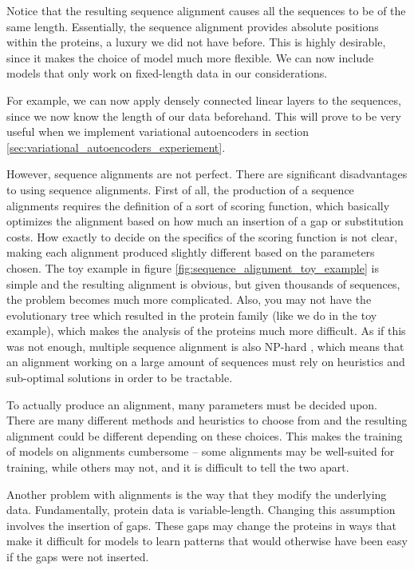 Notice that the resulting sequence alignment causes all the sequences to be of the same length. Essentially, the sequence alignment provides absolute positions within the proteins, a luxury we did not have before. This is highly desirable, since it makes the choice of model much more flexible. We can now include models that only work on fixed-length data in our considerations.

For example, we can now apply densely connected linear layers to the sequences, since we now know the length of our data beforehand. This will prove to be very useful when we implement variational autoencoders in section \ref{sec:variational_autoencoders_experiement}.

However, sequence alignments are not perfect. There are significant disadvantages to using sequence alignments. First of all, the production of a sequence alignments requires the definition of a sort of scoring function, which basically optimizes the alignment based on how much an insertion of a gap or substitution costs. How exactly to decide on the specifics of the scoring function is not clear, making each alignment produced slightly different based on the parameters chosen. The toy example in figure \ref{fig:sequence_alignment_toy_example} is simple and the resulting alignment is obvious, but given thousands of sequences, the problem becomes much more complicated. Also, you may not have the evolutionary tree which resulted in the protein family (like we do in the toy example), which makes the analysis of the proteins much more difficult. As if this was not enough, multiple sequence alignment is also NP-hard \cite{wang1994complexity}, which means that an alignment working on a large amount of sequences must rely on heuristics and sub-optimal solutions in order to be tractable.

To actually produce an alignment, many parameters must be decided upon. There are many different methods and heuristics to choose from and the resulting alignment could be different depending on these choices. This makes the training of models on alignments cumbersome -- some alignments may be well-suited for training, while others may not, and it is difficult to tell the two apart.

Another problem with alignments is the way that they modify the underlying data. Fundamentally, protein data is variable-length. Changing this assumption involves the insertion of gaps. These gaps may change the proteins in ways that make it difficult for models to learn patterns that would otherwise have been easy if the gaps were not inserted.

